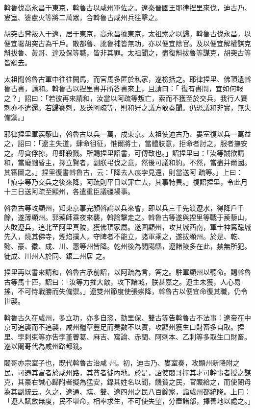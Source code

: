 \begin{pinyinscope}
 斡魯伐高永昌于東京，斡魯古以咸州軍佐之。遼秦晉國王耶律捏里來伐，迪古乃、婁室、婆盧火等將二萬眾，合斡魯古咸州兵往擊之。



 胡突古嘗叛入于遼，居于東京，高永昌據東京，太祖索之以歸。斡魯古伐永昌，以便宜署胡突古為千戶。散都魯、訛魯補皆無功，亦以便宜除官。及以便宜解權謀克斛拔魯、黃哥、達及保等職，皆非其罪。太祖聞之，盡復斛拔魯等謀克，胡突古等皆罷去。



 太祖聞斡魯古軍中往往闕馬，而官馬多匿於私家，遂檢括之。耶律捏里、佛頂遺斡魯古書，請和。斡魯古以捏里書并所答書來上，且請曰：「
 復有書問，宜如何報之？」詔曰：「若彼再來請和，汝當以阿疏等叛亡，索而不獲至於交兵，我行人賽刺亦不遣還。若歸賽刺，及送阿疏等，則和好之議方敢奏聞。仍恐議和非實，無失備禦。」



 耶律捏里軍蒺藜山，斡魯古以兵一萬，戍東京。太祖使迪古乃、婁室復以兵一萬益之，詔曰：「遼主失道，肆命徂征，惟爾將士，當體朕意，拒命者討之，服者撫安之。毋貪俘掠，毋肆殺戮。所賜捏里詔書，可傳致也。」詔捏里曰：「汝等誠欲請和，當廢黜昏主，擇立賢者，副朕弔伐之意，然後可議和約。不然，當盡并爾國。其審圖之。」捏里復書斡魯古，云：「降去人痕孛見還，則當送阿
 疏等。」上曰：「痕孛等乃交兵之後來降，阿疏則平日以罪亡去，其事特異。」復詔捏里，令此月十三日送阿疏至顯州，各遣重臣議疆場事。



 斡魯古等攻顯州，知東京事完顏斡論以兵來會，即以兵三千先渡遼水，得降戶千餘，遂薄顯州。郭藥師乘夜來襲，斡論擊走之。斡魯古等遂與捏里等戰于蒺藜山，大敗遼兵，追北至阿里真陂，獲佛頂家屬。遂圍顯州，攻其城西南，軍士神篤踰城先入，燒其佛寺，煙焰撲人，守陴者不能立，諸軍乘之，遂拔顯州。於是、乾、懿、豪、徽、成、川、惠等州皆降。乾州後為閭陽縣，遼諸陵多在此，禁無所犯。徙成、川州人於同、銀二州居
 之。



 捏里再以書來請和，斡魯古承前詔，以阿疏為言，答之。駐軍顯州以聽命。賜斡魯古等馬十匹，詔曰：「汝等力摧大敵，攻下諸城，朕甚嘉之。遼主未獲，人心易搖，不可恃戰勝而失備禦。」遼雙州節度使張崇降，斡魯古以便宜命復其職，仍令世襲。



 斡魯古久在咸州，多立功，亦多自恣，劾里保、雙古等告斡魯古不法事：遼帝在中京可追襲而不追襲，咸州糧草豐足而奏數不以實，攻顯州獲生口財畜多自取。捏里、孛刺束等亦告孛堇瞢葛、麻吉、窩論、赤閏、阿刺本、乙刺等多取生口財畜。遂以闍哥代為咸州路都銑。



 闍哥亦宗室子也，既代斡魯古治咸
 州。初，迪古乃、婁室奏，攻顯州新降附之民，可遷其富者於咸州路，其貧者徙內地。於是，詔使闍哥擇其才可幹事者授之謀克，其豪右誠心歸附者擬為猛安，錄其姓名以聞，饑貧之民，官賑給之，而使闍母為其副統云。久之，遼通、祺、雙、遼四州之民八百餘家，詣咸州都統降。上曰：「遼人賦斂無度，民不堪命，相率求生，不可使失望，分置諸部，擇善地以處之。」




\end{pinyinscope}
